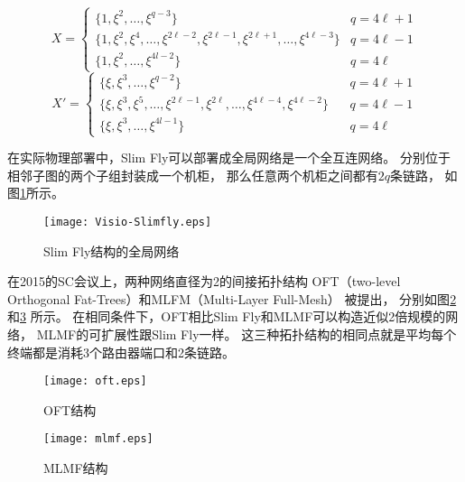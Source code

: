 \begin{equation}\label{equ:generator-sets0}
  X=
  \begin{cases}
    \{1,\xi^2,\ldots,\xi^{q-3}\}& q=4 \ell+1 \\
    \{1,\xi^2,\xi^4,\ldots, \xi^{2\ell-2},\xi^{2\ell-1},\xi^{2\ell+1},\ldots, \xi^{4\ell-3}\} & q=4 \ell-1 \\
    \{1,\xi^2,\ldots,\xi^{4l-2}\} & q=4 \ell
  \end{cases}
\end{equation}
\begin{equation}\label{equ:generator-sets1}
  X'=
  \begin{cases}
    \{\xi,\xi^3,\ldots,\xi^{q-2}\} & q=4 \ell+1 \\
    \{\xi,\xi^3,\xi^5,\ldots,\xi^{2\ell-1}, \xi^{2\ell},\ldots,\xi^{4\ell-4},\xi^{4\ell-2}\}\ \ \ \  & q=4 \ell-1 \\
    \{\xi,\xi^3,\ldots,\xi^{4l-1}\} & q=4 \ell
  \end{cases}
\end{equation}

在实际物理部署中，Slim Fly可以部署成全局网络是一个全互连网络。
分别位于相邻子图的两个子组封装成一个机柜，
那么任意两个机柜之间都有$2q$条链路，
如图\ref{slimfly}所示。

\begin{figure}[htp]
  \centering
    \texttt{[image: Visio-Slimfly.eps]}
    \caption{Slim Fly结构的全局网络}
    \label{slimfly}
\end{figure}

在2015的SC会议上，两种网络直径为2的间接拓扑结构
OFT（two-level Orthogonal Fat-Trees）和MLFM（Multi-Layer Full-Mesh）
被提出，
分别如图\ref{oft}和\ref{mlmf} 所示。
在相同条件下，OFT相比Slim Fly和MLMF可以构造近似2倍规模的网络，
MLMF的可扩展性跟Slim Fly一样。
这三种拓扑结构的相同点就是平均每个终端都是消耗3个路由器端口和2条链路。

\begin{figure}[htp]
  \centering
    \texttt{[image: oft.eps]}
    \caption{OFT结构}
    \label{oft}
\end{figure}

\begin{figure}[htp]
  \centering
    \texttt{[image: mlmf.eps]}
    \caption{MLMF结构}
    \label{mlmf}
\end{figure}


